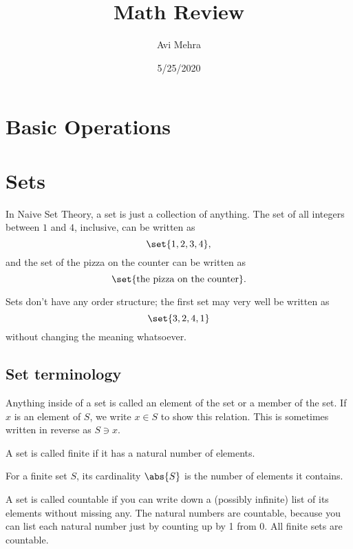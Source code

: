 \documentclass[12pt,paper=letter]{article}
\begin{document}
    \title{Math Review}
    \author{Avi Mehra}
    \date{5/25/2020}
    \maketitle


    \section{Basic Operations}


    \section{Sets}
    In Naive Set Theory,
    a set is just a collection of anything.
    The set of all integers between $1$ and $4$, inclusive,
    can be written as
    \[
        \set{1,2,3,4},
    \]
    and the set of the pizza on the counter can be written as
    \[
        \set{\text{the pizza on the counter}}.
    \]

    Sets don't have any order structure;
    the first set may very well be written as
    \[
        \set{3,2,4,1}
    \]
    without changing the meaning whatsoever.

    \subsection{Set terminology}
    \begin{defboxed}
        Anything inside of a set is called an element of the set or a member of the set.
        If $x$ is an element of $S$,
        we write $x\in S$ to show this relation.
        This is sometimes written in reverse as $S\ni x$.
    \end{defboxed}

    \begin{defboxed}
        A set is called finite if it has a natural number of elements.
    \end{defboxed}

    \begin{defboxed}
        For a finite set $S$,
        its cardinality $\abs{S}$ is the number of elements it contains.
    \end{defboxed}

    \begin{defboxed}
        A set is called countable if you can write down a (possibly infinite) list of its elements without missing any.
        The natural numbers are countable, because you can list each natural number just by counting up by 1 from 0.
        All finite sets are countable.
    \end{defboxed}
\end{document}
